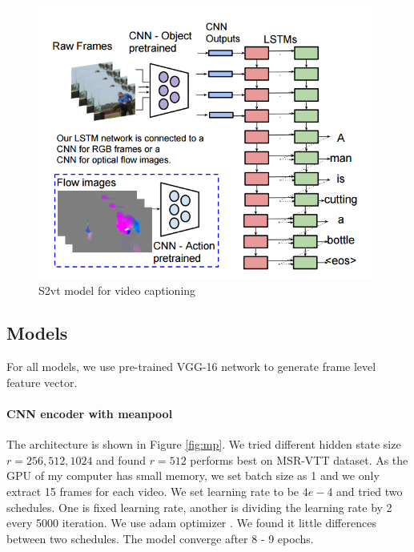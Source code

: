 \begin{figure}[htbp]
\centering
\includegraphics[width=11cm]{resources/s2vt.png}
\caption{S2vt model for video captioning \cite{venugopalan2015sequence}}
\label{fig:s2vt}
\end{figure}

\subsection{Models}
For all models, we use pre-trained VGG-16 \cite{simonyan2014very} network to generate frame level feature vector.
\paragraph{CNN encoder with meanpool}
The architecture is shown in Figure \ref{fig:mp}. We tried different hidden state size $r=256,512,1024$ and found $r=512$ performs best on MSR-VTT dataset. As the GPU of my computer has small memory, we set batch size as 1 and we only extract 15 frames for each video. We set learning rate to be $4e-4$ and tried two schedules. One is fixed learning rate, another is dividing the learning rate by 2 every 5000 iteration. We use adam optimizer \cite{Kingma2014Adam}. We found it little differences between two schedules. The model converge after 8 - 9 epochs.

